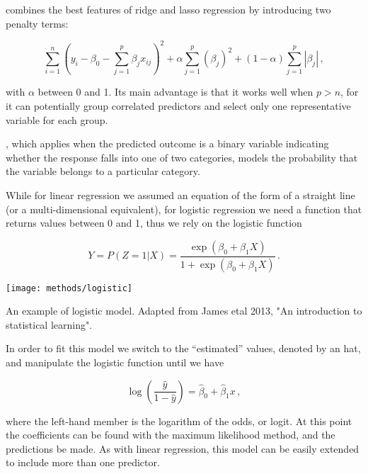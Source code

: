 \documentclass[../main.tex]{subfiles}
\begin{document}
 combines the best 
features of ridge and lasso regression by introducing two penalty terms:

\begin{equation}
	\sum_{i=1}^{n}\left(y_i-\beta_0-\sum_{j=1}^{p}\beta_jx_{ij}\right)^2+
		\alpha\sum_{j=1}^{p}\left(\beta_j\right)^2+
		(1-\alpha)\sum_{j=1}^{p}\left|\beta_j\right|\,,
\end{equation}

with $\alpha$ between 0 and 1. Its main advantage is that it works well 
when $p>n$, for it can potentially group correlated predictors and 
select only one representative variable for each group.

, which applies when the 
predicted outcome is a binary variable indicating whether the response 
falls into one of two categories, models the probability that the 
variable belongs to a particular category.

While for linear regression we assumed an equation of the form of a 
straight line (or a multi-dimensional equivalent), for logistic 
regression we need a function that returns values between 0 and 1, thus 
we rely on the logistic function

\begin{equation}
	Y = P(Z = 1 | X) =
		\frac{\exp(\beta_0+\beta_1X)}{1+\exp(\beta_0+\beta_1X)}\,.
\end{equation}

\begin{marginfigure}[0cm]
	\texttt{[image: methods/logistic]}
	\caption{An example of logistic model. Adapted from James etal 2013, 
		"An introduction to statistical learning".}
\end{marginfigure}

In order to fit this model we switch to the \enquote{estimated} values, 
denoted by an hat, and manipulate the logistic function until we have

\begin{equation}
	\log\left(\frac{\hat{y}}{1-\hat{y}}\right) =
		\hat{\beta}_0 + \hat{\beta}_1 x\,,
\end{equation}

where the left-hand member is the logarithm of the odds, or logit. At 
this point the coefficients can be found with the maximum likelihood 
method, and the predictions be made. As with linear regression, this 
model can be easily extended to include more than one predictor.
\end{document}
